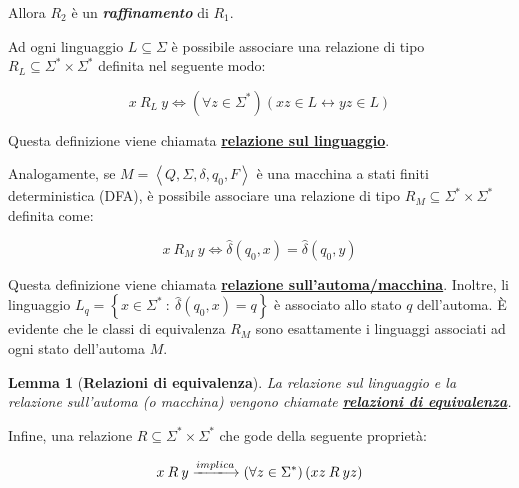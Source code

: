\documentclass[a4paper]{article}
\newtheorem{lemma}{Lemma}
\begin{document}
	\noindent
	Allora $R_{2}$ è un \emph{\textbf{raffinamento}} di $R_{1}$.\newline
	
	\newpage
	
	\noindent
	Ad ogni linguaggio $L \subseteq \Sigma$ è possibile associare una relazione di tipo $R_{L} \subseteq \Sigma^{*} \times \Sigma^{*}$ definita nel seguente modo:
	
	\begin{equation}\label{relazione sul linguaggio}
		x \: R_{L} \: y \iff \left(\forall z \in \Sigma^{*}\right) \left(xz \in L \leftrightarrow yz \in L \right)
	\end{equation}
	
	\noindent
	Questa definizione viene chiamata \textcolor{Red3}{\textbf{\underline{relazione sul linguaggio}}}.\newline
	
	\noindent
	Analogamente, se $M = \left\langle Q, \Sigma, \delta, q_{0}, F \right\rangle$ è una macchina a stati finiti deterministica (DFA), è possibile associare una relazione di tipo $R_{M} \subseteq \Sigma^{*} \times \Sigma^{*}$ definita come:
	
	\begin{equation}\label{relazione sull'automa}
		x \: R_{M} \: y \iff \hat{\delta}\left(q_{0}, x \right) = \hat{\delta} \left(q_{0}, y\right)
	\end{equation}
	
	\noindent
	Questa definizione viene chiamata \textcolor{Red3}{\textbf{\underline{relazione sull'automa/macchina}}}. Inoltre, li linguaggio $L_{q} = \left\{x \in \Sigma^{*} \: : \: \hat{\delta}\left(q_{0}, x\right) = q\right\}$ è associato allo stato $q$ dell'automa. È evidente che le classi di equivalenza $R_{M}$ sono esattamente i linguaggi associati ad ogni stato dell'automa $M$.\newline
	
	\begin{lemma}[\textbf{Relazioni di equivalenza}]
		La relazione sul linguaggio e la relazione sull'automa (o macchina) vengono chiamate \textcolor{Red3}{\textbf{\underline{relazioni di equivalenza}}}.
	\end{lemma}
	\:\newline
	
	\noindent
	Infine, una relazione $R \subseteq \Sigma^{*} \times \Sigma^{*}$ che gode della seguente proprietà:
	
	\begin{equation*}
		x \: R \: y \xlongrightarrow{implica} \left(\forall z \in \Sigma^{*}\right) \left(xz \: R \: yz\right)
	\end{equation*}
\end{document}
